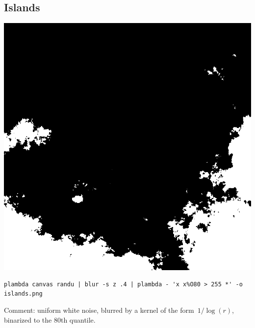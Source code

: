 \subsection{Islands}
\includegraphics{islands.png}
\begin{verbatim}
plambda canvas randu | blur -s z .4 | plambda - 'x x%O80 > 255 *' -o islands.png
\end{verbatim}
Comment: uniform white noise, blurred by a kernel of the form~$1/\log(r)$,
binarized to the 80th quantile.


